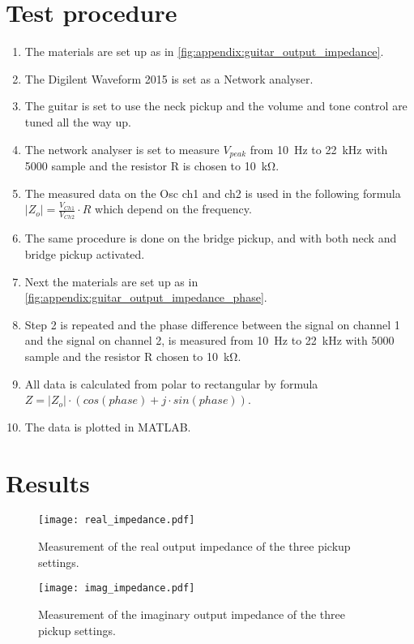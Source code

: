 \newpage

\section*{Test procedure}


\begin{enumerate}
\item The materials are set up as in \autoref{fig:appendix:guitar_output_impedance}.
\item The Digilent Waveform 2015 is set as a Network analyser.
\item  The guitar is set to use the neck pickup and the volume and tone control are tuned all the way up.
\item  The network analyser is set to measure $V_{peak}$ from \SI{10}{\hertz} to \SI{22}{\kilo\hertz} with 5000 sample and the resistor R is chosen to \SI{10}{\kilo\ohm}.
\item The measured data on the Osc ch1 and ch2 is used in the following formula $\left | Z_o \right | = \frac{V_{Ch1}}{V_{Ch2}}\cdot R$ which depend on the frequency. 
\item The same procedure is done on the bridge pickup, and with both neck and bridge pickup activated.
\item Next the materials are set up as in \autoref{fig:appendix:guitar_output_impedance_phase}.
\item Step 2 is repeated and the  phase difference between the signal on channel 1 and the signal on channel 2, is measured from \SI{10}{\hertz} to \SI{22}{\kilo\hertz} with 5000 sample and the resistor R chosen to \SI{10}{\kilo\ohm}.
\item All data is calculated from polar to rectangular by formula $Z=\left | Z_o \right | \cdot (cos(phase) + j \cdot sin(phase))$.
\item The data is plotted in MATLAB.
\end{enumerate}

\newpage
\section*{Results}

\begin{figure}[htbp!]
	\centering
		\texttt{[image: real\_impedance.pdf]}
		\caption{Measurement of the real output impedance of the three pickup settings.}
		\label{fig:appendix:real_impedance}
		\texttt{[image: imag\_impedance.pdf]}
		\caption{Measurement of the imaginary output impedance of the three pickup settings.}
		\label{fig:appendix:imaginary_impedance}
\end{figure}

